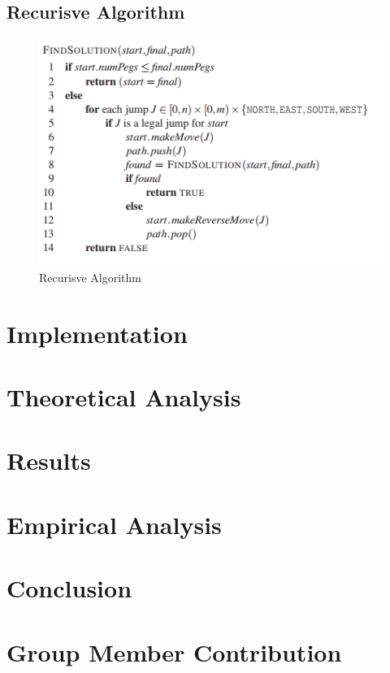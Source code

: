 \documentclass[a4paper]{article}
\begin{document}
\subsection{Recurisve Algorithm}
\begin{figure}[H]
	\centering
	\includegraphics[width=1.0\textwidth,scale=1.0]{images/recursive_algorithm}
	\caption{Recurisve Algorithm \cite{lab5}}
\end{figure}

\section{Implementation}



\section{Theoretical Analysis}

\section{Results}

\section{Empirical Analysis}


\section{Conclusion}

\section{Group Member Contribution}
\end{document}
